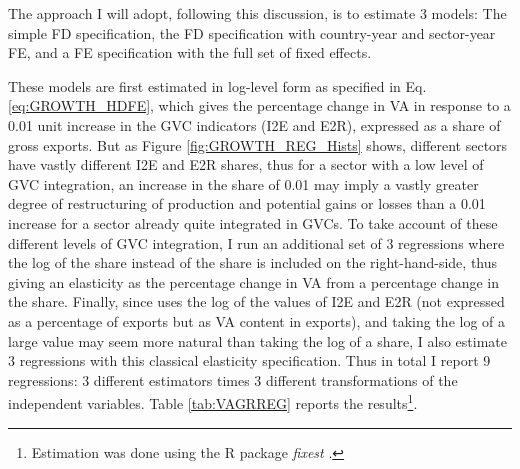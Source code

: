 \documentclass[a4paper]{article}
\begin{document}
The approach I will adopt, following this discussion, is to estimate 3 models: The simple FD specification, the FD specification with country-year and sector-year FE, and a FE specification with the full set of fixed effects. \newline 

These models are first estimated in log-level form as specified in Eq. \ref{eq:GROWTH_HDFE}, which gives the percentage change in VA in response to a 0.01 unit increase in the GVC indicators (I2E and E2R), expressed as a share of gross exports. But as Figure \ref{fig:GROWTH_REG_Hists} shows, different sectors have vastly different I2E and E2R shares, thus for a sector with a low level of GVC integration, an increase in the share of 0.01 may imply a vastly greater degree of restructuring of production and potential gains or losses than a 0.01 increase for a sector already quite integrated in GVCs. To take account of these different levels of GVC integration, I run an additional set of 3 regressions where the log of the share instead of the share is included on the right-hand-side, thus giving an elasticity as the percentage change in VA from a percentage change in the share. Finally, since \citet{Kummritz20161} uses the log of the values of I2E and E2R (not expressed as a percentage of exports but as VA content in exports), and taking the log of a large value may seem more natural than taking the log of a share, I also estimate 3 regressions with this classical elasticity specification. Thus in total I report 9 regressions:  3 different estimators times 3 different transformations of the independent variables. Table \ref{tab:VAGRREG} reports the results\footnote{Estimation was done using the R package \textit{fixest} \citep{fixest2018}.}. \newline %
\end{document}
